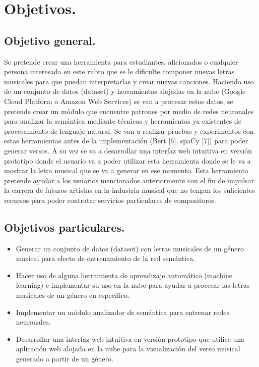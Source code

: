 \documentclass[12pt, a4paper, titlepage]{report}
\begin{document}
\section{Objetivos.}
	\subsection{Objetivo general.}
	Se pretende crear una herramienta para estudiantes, aficionados o cualquier persona interesada en este rubro que se le dificulte componer nuevas letras musicales para que puedan interpretarlas y crear nuevas canciones. Haciendo uso de un conjunto de datos (dataset) y herramientas alojadas en la nube (Google Cloud Platform o Amazon Web Services) se van a procesar estos datos, se pretende crear un módulo que encuentre patrones por medio de redes neuronales para analizar la semántica mediante técnicas y herramientas ya existentes de procesamiento de lenguaje natural. Se van a realizar pruebas y experimentos con estas herramientas antes de la implementación (Bert [6], spaCy [7]) para poder generar versos. A su vez se va a desarrollar una interfaz web intuitiva en versión prototipo donde el usuario va a poder utilizar esta herramienta donde se le va a mostrar la letra musical que se va a generar en ese momento. Esta herramienta pretende ayudar a los usuarios mencionados anteriormente con el fin de impulsar la carrera de futuros artistas en la industria musical que no tengan los suficientes recursos para poder contratar servicios particulares de compositores.
	
	\subsection{Objetivos particulares.}
		\begin{itemize}
			\item Generar un conjunto de datos (dataset) con letras musicales de un género musical para efecto de entrenamiento de la red semántica.
    		\item Hacer uso de alguna herramienta de aprendizaje automático (machine learning) e implementar su uso en la nube para ayudar a procesar las letras musicales de un género en específico.
    		\item Implementar un módulo analizador de semántica para entrenar redes neuronales.
    		\item Desarrollar una interfaz web intuitiva en versión prototipo que utilice una aplicación web alojada en la nube para la visualización del verso musical generado a partir de un género.
    	\end{itemize}
			
\end{document}
